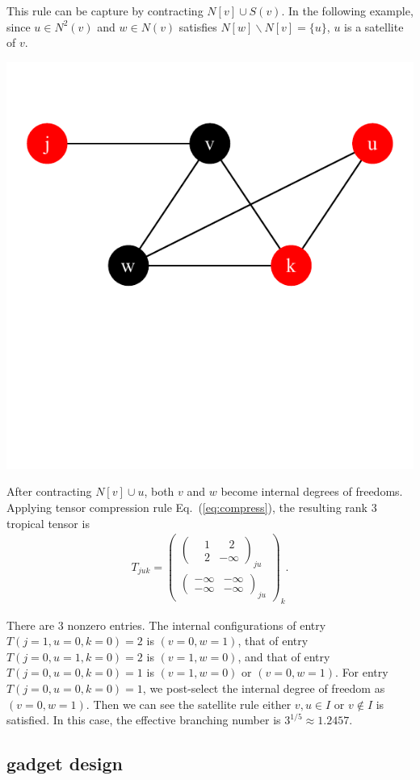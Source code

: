 \documentclass{article}
\newcommand{\<}{\langle}
\renewcommand{\>}{\rangle}
\newcommand{\Eq}[1]{Eq.~(\ref{#1})}
\theoremstyle{definition}\newtheorem{definition}{\textit{Definition}}
\begin{document}
This rule can be capture by contracting $N[v] \cup S(v)$.
In the following example, since $u \in N^2(v)$ and $w \in N(v)$ satisfies $N[w] \backslash N[v] = \{u\}$, $u$ is a satellite of $v$.

\centerline{\includegraphics[width=0.4\columnwidth,trim={0 3.5cm 0 1cm},clip]{../notebooks/satellite.pdf}}

After contracting $N[v] \cup u$, both $v$ and $w$ become internal degrees of freedoms.
Applying tensor compression rule \Eq{eq:compress}, the resulting rank 3 tropical tensor is
\begin{align}
    T_{juk} = \left(\begin{matrix}
        \left(\begin{matrix}
        ~~~~1 & ~~~~2 \\
        ~~~~2 & -\infty
        \end{matrix}\right)_{ju}\\
        \left(\begin{matrix}
        -\infty & -\infty \\
        -\infty & -\infty
        \end{matrix}\right)_{ju}
    \end{matrix}\right)_{k}.
\end{align}

There are 3 nonzero entries. The internal configurations of entry $T(j=1, u=0, k=0) = 2$ is $(v=0, w =1)$,
that of entry $T(j=0, u=1, k=0)=2$ is $(v=1, w=0)$, and that of entry $T(j=0, u=0, k=0)=1$ is $(v=1, w=0)$ or $(v=0, w=1)$.
For entry $T(j=0, u=0, k=0)=1$, we post-select the internal degree of freedom as $(v=0, w=1)$.
Then we can see the satellite rule either ${v, u} \in I$ or $v \notin I$ is satisfied.
In this case, the effective branching number is $3^{1/5}\approx 1.2457$. 

\subsection{gadget design}
\end{document}
